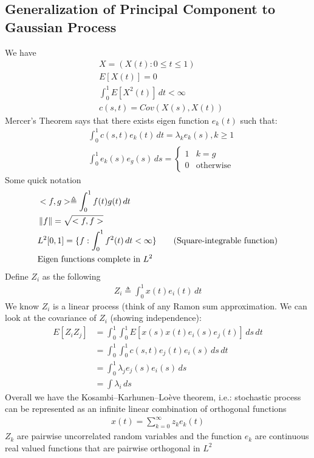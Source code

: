 \subsection{Generalization of Principal Component to Gaussian Process}
We have 
    \begin{align*}
        & X = (X(t): 0 \leq t \leq 1) \\
        & E[X(t)] = 0\\
        & \int_0^1 E[X^2(t)] \, dt < \infty \\
        & c(s,t) = Cov(X(s), X(t))
    \end{align*}
Mercer's Theorem says that there exists eigen function $e_k(t)$ such that: 
    \begin{align*}
        & \int_{0}^1 c(s,t) e_k(t) \,dt = \lambda_k e_k(s), k \geq 1\\
        & \int_{0}^1 e_k(s) e_g(s) \, ds = \begin{cases} 1 & k=g \\ 0 & \text{otherwise} \end{cases}
    \end{align*}
Some quick notation 
    \begin{align*}
        & <f,g> \triangleq \int_0^1 f(t) g(t) \, dt \\
        & \left\lVert f\right\rVert = \sqrt{<f,f>} \\
        & L^2[0,1] = \{ f: \int_0^1 f^2(t) \, dt < \infty \} \tag{Square-integrable function} \\
        & \text{Eigen functions complete in $L^2$}
    \end{align*}
Define $Z_i$ as the following 
    \begin{align*}
        Z_i \triangleq \int_0^1 x(t) e_i(t) \, dt
    \end{align*}
We know $Z_i$ is a linear process (think of any Ramon sum approximation. We can look at the covariance of $Z_i$ (showing independence): 
    \begin{align*}
        E[Z_i Z_j]
        & = \int_0^1 \int_0^1 E[x(s) x(t) e_i(s) e_j(t)] \, ds \, dt \\
        & = \int_0^1 \int_0^1 c(s,t) e_j(t)  e_i(s) \, ds \, dt \\
        & = \int_0^1 \lambda_j e_j(s)  e_i(s) \, ds \\
        & = \int \lambda_i \, ds \tag{If $i=j$, because $\int_0^1 e_i e_j = 0$ if $i\neq j$}
    \end{align*}
Overall we have the Kosambi–Karhunen–Loève theorem, i.e.:  stochastic process can be represented as an infinite linear combination of orthogonal functions
    \begin{align*}
        x(t) = \sum_{k=0}^\infty z_k e_k(t)
    \end{align*}
$Z_k$ are pairwise uncorrelated random variables and the function $e_k$ are continuous real valued functions that are pairwise orthogonal in $L^2$


